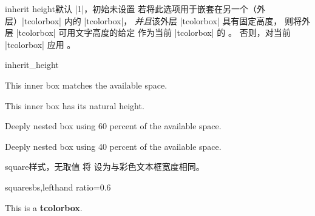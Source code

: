 \clearpage
\begin{docTcbKey}[][doc new={2017-06-28}]{inherit height}{}{默认 |1|，初始未设置}
  若将此选项用于嵌套在另一个（外层）|tcolorbox| 内的 |tcolorbox|，
  \emph{并且}该外层 |tcolorbox| 具有固定高度，
  则将外层 |tcolorbox| 可用文字高度的给定 
  作为当前 |tcolorbox| 的 。
  否则，对当前 |tcolorbox| 应用 。

\begin{exdispExample}{inherit_height}

\begin{tcolorbox}[title=Outer box with fixed height 3.5cm,height=3.5cm]
  \begin{tcolorbox}[title=Inner box,nobeforeafter,inherit height]
    This inner box matches the available space.
  \end{tcolorbox}
\end{tcolorbox}

\begin{tcolorbox}[title=Outer box with natural height]
  \begin{tcolorbox}[title=Inner box,nobeforeafter,inherit height]
    This inner box has its natural height.
  \end{tcolorbox}
\end{tcolorbox}

\begin{tcolorbox}[title=Outer box with fixed height 5cm,height=5cm]
  \begin{tcolorbox}[title=Inner box,nobeforeafter,inherit height]
    \begin{tcolorbox}[colframe=red,beforeafter skip=0pt,inherit height=0.6]
      Deeply nested box using 60 percent of the available space.
    \end{tcolorbox}
    \begin{tcolorbox}[colframe=red,beforeafter skip=0pt,inherit height=0.4]
      Deeply nested box using 40 percent of the available space.
    \end{tcolorbox}
  \end{tcolorbox}
\end{tcolorbox}
\end{exdispExample}
\end{docTcbKey}


\clearpage

\begin{docTcbKey}[][doc new=2015-05-05]{square}{}{样式，无取值}
  将  设为与彩色文本框宽度相同。
\begin{exdispExample*}{square}{sbs,lefthand ratio=0.6}
\begin{tcolorbox}[width=3cm,
  colback=red!5!white,
  colframe=red!75!black,
  halign=center,valign=center,
  square]
This is a \textbf{tcolorbox}.
\end{tcolorbox}
\end{exdispExample*}
\end{docTcbKey}



